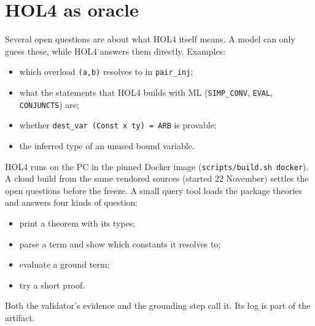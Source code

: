 \documentclass[11pt,a4paper]{article}
\newcommand{\code}[1]{\texttt{#1}}
\begin{document}
\section{HOL4 as oracle}\label{sec:hol4}
Several open questions are about what HOL4 itself means. A model can only guess these, while HOL4 answers them directly. Examples:
\begin{itemize}
\item which overload \code{(a,b)} resolves to in \code{pair\_inj};
\item what the statements that HOL4 builds with ML (\code{SIMP\_CONV}, \code{EVAL}, \code{CONJUNCTS}) are;
\item whether \code{dest\_var (Const x ty) = ARB} is provable;
\item the inferred type of an unused bound variable.
\end{itemize}

HOL4 runs on the PC in the pinned Docker image (\code{scripts/build.sh docker}). A cloud build from the same vendored sources (started 22 November) settles the open questions before the freeze. A small query tool loads the package theories and answers four kinds of question:
\begin{itemize}
\item print a theorem with its types;
\item parse a term and show which constants it resolves to;
\item evaluate a ground term;
\item try a short proof.
\end{itemize}
Both the validator's evidence and the grounding step call it. Its log is part of the artifact.
\end{document}

